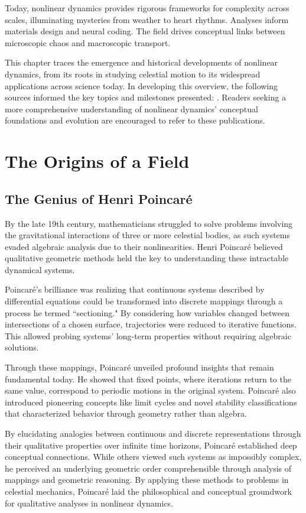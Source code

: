 Today, nonlinear dynamics provides rigorous frameworks for complexity across scales, illuminating mysteries from weather to heart rhythms. Analyses inform materials design and neural coding. The field drives conceptual links between microscopic chaos and macroscopic transport.

This chapter traces the emergence and historical developments of nonlinear dynamics, from its roots in studying celestial motion to its widespread applications across science today. In developing this overview, the following sources informed the key topics and milestones presented: \citep{Kingsland1995,Goodstein2007}. Readers seeking a more comprehensive understanding of nonlinear dynamics' conceptual foundations and evolution are encouraged to refer to these publications.

\section{The Origins of a Field}

\subsection{The Genius of Henri Poincaré}

By the late 19th century, mathematicians struggled to solve problems involving the gravitational interactions of three or more celestial bodies, as such systems evaded algebraic analysis due to their nonlinearities. Henri Poincaré believed qualitative geometric methods held the key to understanding these intractable dynamical systems.

Poincaré's brilliance was realizing that continuous systems described by differential equations could be transformed into discrete mappings through a process he termed ``sectioning." By considering how variables changed between intersections of a chosen surface, trajectories were reduced to iterative functions. This allowed probing systems' long-term properties without requiring algebraic solutions.

Through these mappings, Poincaré unveiled profound insights that remain fundamental today. He showed that fixed points, where iterations return to the same value, correspond to periodic motions in the original system. Poincaré also introduced pioneering concepts like limit cycles and novel stability classifications that characterized behavior through geometry rather than algebra.

By elucidating analogies between continuous and discrete representations through their qualitative properties over infinite time horizons, Poincaré established deep conceptual connections. While others viewed such systems as impossibly complex, he perceived an underlying geometric order comprehensible through analysis of mappings and geometric reasoning. By applying these methods to problems in celestial mechanics, Poincaré laid the philosophical and conceptual groundwork for qualitative analyses in nonlinear dynamics.


